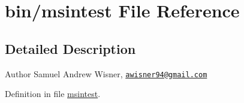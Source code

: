 \hypertarget{msintest}{\section{bin/msintest File Reference}
\label{msintest}
}


\subsection{Detailed Description}
\begin{DoxyAuthor}{Author}
Samuel Andrew Wisner, \href{mailto:awisner94@gmail.com}{\tt awisner94@gmail.\+com} 
\end{DoxyAuthor}


Definition in file \hyperlink{msintest_source}{msintest}.


